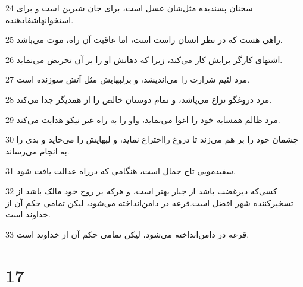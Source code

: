 \par 24 سخنان پسندیده مثل‌شان عسل است، برای جان شیرین است و برای استخوانهاشفادهنده.
\par 25 راهی هست که در نظر انسان راست است، اما عاقبت آن راه، موت می‌باشد.
\par 26 اشتهای کارگر برایش کار می‌کند، زیرا که دهانش او را بر آن تحریض می‌نماید.
\par 27 مرد لئیم شرارت را می‌اندیشد، و برلبهایش مثل آتش سوزنده است.
\par 28 مرد دروغگو نزاع می‌پاشد، و نمام دوستان خالص را از همدیگر جدا می‌کند.
\par 29 مرد ظالم همسایه خود را اغوا می‌نماید، واو را به راه غیر نیکو هدایت می‌کند.
\par 30 چشمان خود را بر هم می‌زند تا دروغ رااختراع نماید، و لبهایش را می‌خاید و بدی را به انجام می‌رساند.
\par 31 سفیدمویی تاج جمال است، هنگامی که درراه عدالت یافت شود.
\par 32 کسی‌که دیرغضب باشد از جبار بهتر است، و هر‌که بر روح خود مالک باشد از تسخیرکننده شهر افضل است.قرعه در دامن‌انداخته می‌شود، لیکن تمامی حکم آن از خداوند است.
\par 33 قرعه در دامن‌انداخته می‌شود، لیکن تمامی حکم آن از خداوند است.
 
\chapter{17}

